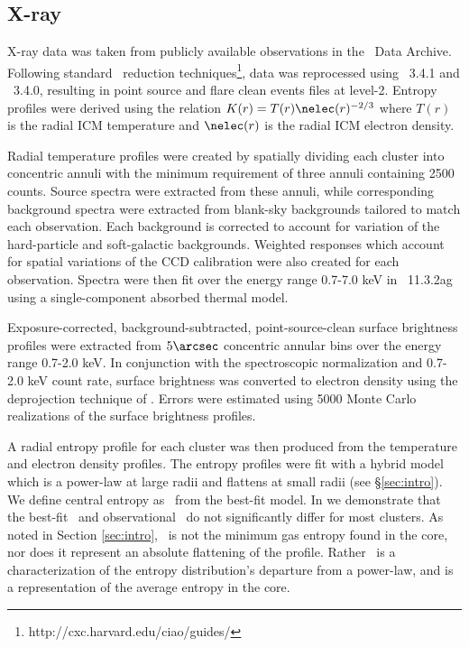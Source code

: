 \documentclass{emulateapj}
\begin{document}
\subsection{X-ray}
\label{sec:xray}

X-ray data was taken from publicly available observations in the
\Chandra\ Data Archive. Following standard \Ciao\ reduction
techniques\footnote{http://cxc.harvard.edu/ciao/guides/}, data was
reprocessed using \Ciao\ 3.4.1 and \Caldb\ 3.4.0, resulting in point
source and flare clean events files at level-2. Entropy profiles were
derived using the relation $K(r) = T(r) \nelec(r)^{-2/3}$ where $T(r)$
is the radial ICM temperature and $\nelec(r)$ is the radial ICM
electron density.

Radial temperature profiles were created by spatially dividing each
cluster into concentric annuli with the minimum requirement of three
annuli containing 2500 counts. Source spectra were extracted from
these annuli, while corresponding background spectra were extracted
from blank-sky backgrounds tailored to match each observation.  Each
background is corrected to account for variation of the hard-particle
and soft-galactic backgrounds. Weighted responses which account for
spatial variations of the CCD calibration were also created for each
observation. Spectra were then fit over the energy range 0.7-7.0 keV
in \xspec\ 11.3.2ag \citep{xspec} using a single-component absorbed
thermal model.

Exposure-corrected, background-subtracted, point-source-clean surface
brightness profiles were extracted from $5\arcsec$ concentric annular
bins over the energy range 0.7-2.0 keV. In conjunction with the
spectroscopic normalization and 0.7-2.0 keV count rate, surface
brightness was converted to electron density using the deprojection
technique of \cite{kriss83}. Errors were estimated using 5000 Monte
Carlo realizations of the surface brightness profiles.

A radial entropy profile for each cluster was then produced from the
temperature and electron density profiles. The entropy profiles were
fit with a hybrid model which is a power-law at large radii and
flattens at small radii (see \S\ref{sec:intro}). We define central
entropy as \kna\ from the best-fit model. In \cite{accept} we
demonstrate that the best-fit \kna\ and observational \kna\ do not
significantly differ for most clusters. As noted in Section
\ref{sec:intro}, \kna\ is not the minimum gas entropy found in the
core, nor does it represent an absolute flattening of the
profile. Rather \kna\ is a characterization of the entropy
distribution's departure from a power-law, and is a representation of
the average entropy in the core.
\end{document}
